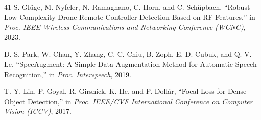 \documentclass[runningheads]{llncs}
\begin{document}
\begin{thebibliography}{41}
S. Gl\"{u}ge, M. Nyfeler, N. Ramagnano, C. Horn, and C. Sch\"{u}pbach,
``Robust Low-Complexity Drone Remote Controller Detection Based on {RF} Features,''
in \emph{Proc. IEEE Wireless Communications and Networking Conference (WCNC)}, 2023.

D. S. Park, W. Chan, Y. Zhang, C.-C. Chiu, B. Zoph, E. D. Cubuk, and Q. V. Le,
``{SpecAugment}: A Simple Data Augmentation Method for Automatic Speech Recognition,''
in \emph{Proc. Interspeech}, 2019.

T.-Y. Lin, P. Goyal, R. Girshick, K. He, and P. Doll\'{a}r,
``Focal Loss for Dense Object Detection,''
in \emph{Proc. IEEE/CVF International Conference on Computer Vision (ICCV)}, 2017.

\end{thebibliography}
\end{document}
